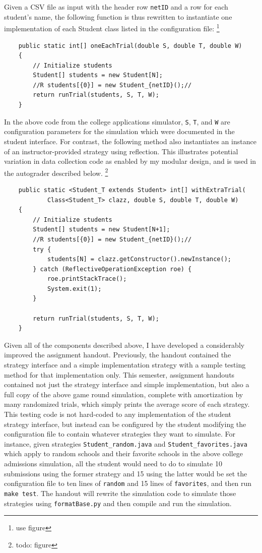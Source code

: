 \documentclass[pageno]{jpaper}
\begin{document}
Given a CSV file as input with the header row \texttt{netID} and a row for each student's name, the following function is thus rewritten to instantiate one implementation of each Student class listed in the configuration file:
\footnote{use figure}
\begin{verbatim}
    public static int[] oneEachTrial(double S, double T, double W)
    {
        // Initialize students
        Student[] students = new Student[N];
        //R students[{0}] = new Student_{netID}();//
        return runTrial(students, S, T, W);
    }
\end{verbatim}
In the above code from the college applications simulator, \texttt{S}, \texttt{T}, and \texttt{W} are configuration parameters for the simulation which were documented in the student interface.
For contrast, the following method also instantiates an instance of an instructor-provided strategy using reflection.
This illustrates potential variation in data collection code as enabled by my modular design, and is used in the autograder described below.
\footnote{todo: figure}
\begin{verbatim}
    public static <Student_T extends Student> int[] withExtraTrial(
            Class<Student_T> clazz, double S, double T, double W)
    {
        // Initialize students
        Student[] students = new Student[N+1];
        //R students[{0}] = new Student_{netID}();//
        try {
            students[N] = clazz.getConstructor().newInstance();
        } catch (ReflectiveOperationException roe) {
            roe.printStackTrace();
            System.exit(1);
        }

        return runTrial(students, S, T, W);
    }
\end{verbatim}

Given all of the components described above, I have developed a considerably improved the assignment handout.
Previously, the handout contained the strategy interface and a simple implementation strategy with a sample testing method for that implementation only.
This semester, assignment handouts contained not just the strategy interface and simple implementation, but also a full copy of the above game round simulation, complete with amortization by many randomized trials, which simply prints the average score of each strategy.
This testing code is not hard-coded to any implementation of the student strategy interface, but instead can be configured by the student modifying the configuration file to contain whatever strategies they want to simulate.
For instance, given strategies \texttt{Student\_random.java} and \texttt{Student\_favorites.java} which apply to random schools and their favorite schools in the above college admissions simulation, all the student would need to do to simulate 10 submissions using the former strategy and 15 using the latter would be set the configuration file to ten lines of \texttt{random} and 15 lines of \texttt{favorites}, and then run \texttt{make test}.
The handout will rewrite the simulation code to simulate those strategies using \texttt{formatBase.py} and then compile and run the simulation.
\end{document}

